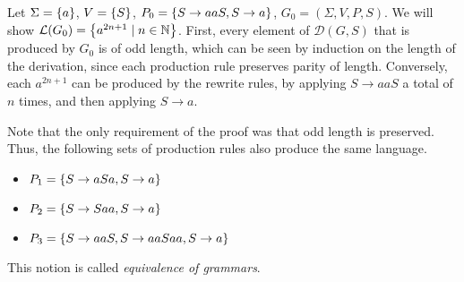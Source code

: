 \begin{example}
	Let \( \Sigma = \qty{a} \), \( V = \qty{S} \), \( P_0 = \qty{S \to aaS, S \to a} \), \( G_0 = (\Sigma, V, P, S) \).
	We will show \( \mathcal L(G_0) = \qty{a^{2n+1} \mid n \in \mathbb N} \).
	First, every element of \( \mathcal D(G,S) \) that is produced by \( G_0 \) is of odd length, which can be seen by induction on the length of the derivation, since each production rule preserves parity of length.
	Conversely, each \( a^{2n+1} \) can be produced by the rewrite rules, by applying \( S \to aaS \) a total of \( n \) times, and then applying \( S \to a \).

	Note that the only requirement of the proof was that odd length is preserved. Thus, the following sets of production rules also produce the same language.
	\begin{itemize}
	\item \( P_1 = \qty{S \to aSa, S \to a} \)
	\item \( P_2 = \qty{S \to Saa, S \to a} \)
	\item \( P_3 = \qty{S \to aaS, S \to aaSaa, S \to a} \)
	\end{itemize}
	This notion is called \emph{equivalence of grammars}.
\end{example}
